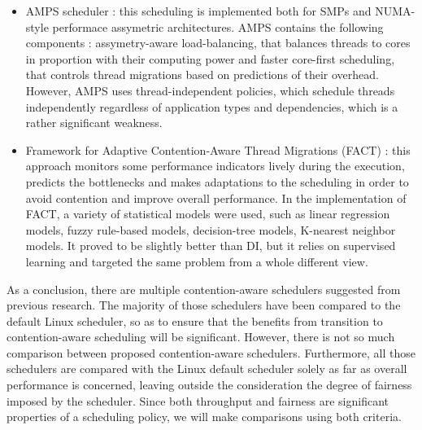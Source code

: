 \documentclass[diploma]{Styles/softlab-thesis}
\begin{document}
\begin{itemize}
    \item AMPS scheduler \cite{reference24} : this scheduling is implemented both for SMPs and NUMA-style performace assymetric architectures. AMPS contains the following components : assymetry-aware load-balancing, that balances threads to cores in proportion with their computing power and faster core-first scheduling, that controls thread migrations based on predictions of their overhead. However, AMPS uses thread-independent policies, which schedule threads independently regardless of application types and dependencies, which is a rather significant weakness. \\
    \item Framework for Adaptive Contention-Aware Thread Migrations (FACT) \cite{reference20} : this approach monitors some performance indicators lively during the execution, predicts the bottlenecks and makes adaptations to the scheduling in order to avoid contention and improve overall performance. In the implementation of FACT, a variety of statistical models were used, such as linear regression models, fuzzy rule-based models, decision-tree models, K-nearest neighbor models. It proved to be slightly better than DI, but it relies on supervised learning and targeted the same problem from a whole different view. \\
\end{itemize}

As a conclusion, there are multiple contention-aware schedulers suggested from previous research. The majority of those schedulers have been compared to the default Linux scheduler, so as to ensure that the benefits from transition to contention-aware scheduling will be significant. However, there is not so much comparison between proposed contention-aware schedulers. Furthermore, all those schedulers are compared with the Linux default scheduler solely as far as overall performance is concerned, leaving outside the consideration the degree of fairness imposed by the scheduler. Since both throughput and fairness are significant properties of a scheduling policy, we will make comparisons using both criteria. \\
\end{document}
